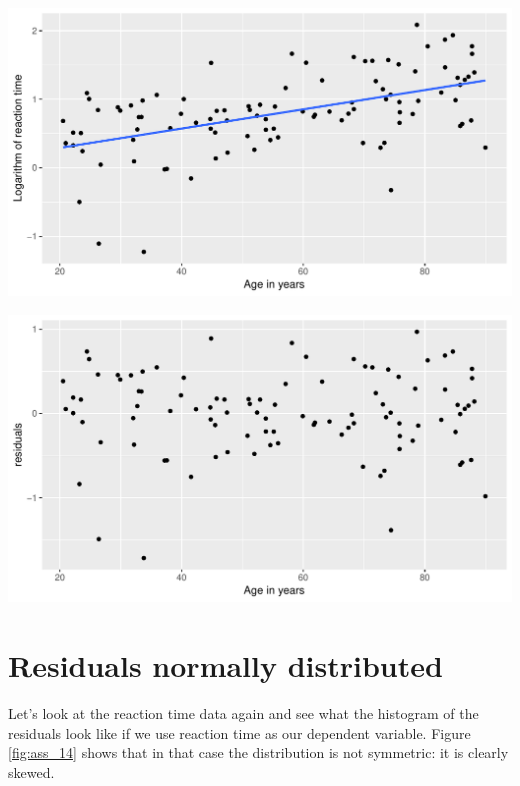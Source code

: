 \documentclass[]{report}\usepackage[]{graphicx}\usepackage[]{color}
\makeatletter
\def\maxwidth{ %
  \ifdim\Gin@nat@width>\linewidth
    \linewidth
  \else
    \Gin@nat@width
  \fi
}
\newenvironment{knitrout}{}{} %
\makeatother
\begin{document}
\begin{knitrout}
\color{fgcolor}

{\centering \includegraphics[width=\maxwidth]{figure/ass_12-1} 

}



\end{knitrout}

\begin{knitrout}
\color{fgcolor}

{\centering \includegraphics[width=\maxwidth]{figure/ass_13-1} 

}



\end{knitrout}


\section{Residuals normally distributed}

Let's look at the reaction time data again and see what the histogram of the residuals look like if we use reaction time as our dependent variable. Figure \ref{fig:ass_14} shows that in that case the distribution is not symmetric: it is clearly skewed. 
\end{document}
